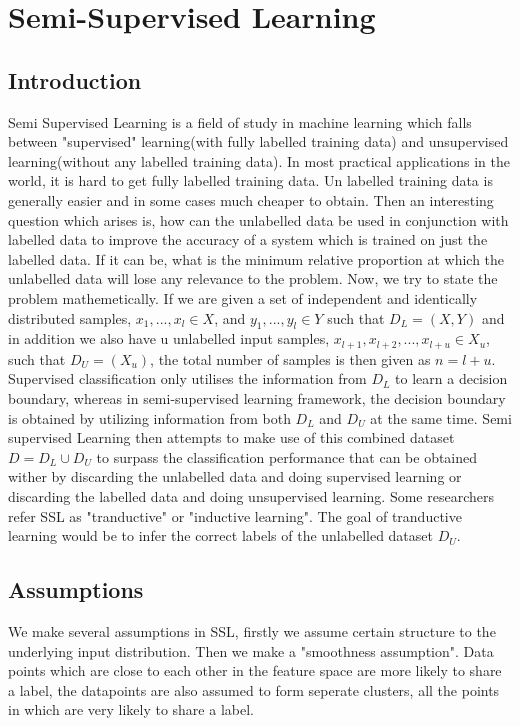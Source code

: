 \documentclass[a4paper,11pt]{kth-mag}
\begin{document}
\chapter{Semi-Supervised Learning}
\section{Introduction}
Semi Supervised Learning is a field of study in machine learning which falls between "supervised" learning(with fully labelled training data) and unsupervised learning(without any labelled training data). In most practical applications in the world, it is hard to get fully labelled training data. Un labelled training data is generally easier and in some cases much cheaper to obtain. Then an interesting question which arises is, how can the unlabelled data be used in conjunction with labelled data to improve the accuracy of a system which is trained on just the labelled data. If it can be, what is the minimum relative proportion at which the unlabelled data will lose any relevance to the problem. Now, we try to state the problem mathemetically. If we are given a set of  independent and identically distributed samples, $x_{1}, ..., x_{l} \in X$, and $y_{1}, ..., y_{l} \in Y$ such that $D_{L} = (X,Y)$ and in addition we also have u unlabelled input samples, $x_{l+1}, x_{l+2}, ..., x_{l+u} \in X_{u}$, such that $D_{U} = (X_{u})$, the total number of samples is then given as $n=l + u$. Supervised classification only utilises the information from $D_{L}$ to learn a decision boundary, whereas in semi-supervised learning framework, the decision boundary is obtained by utilizing information from both $D_{L}$ and $D_{U}$ at the same time. Semi supervised Learning then attempts to make use of this combined dataset $D = D_{L} \cup D_{U}$ to surpass the classification performance that can be obtained wither by discarding the unlabelled data and doing supervised learning or discarding the labelled data and doing unsupervised learning. Some researchers refer SSL as "tranductive" or "inductive learning". The goal of tranductive learning would be to infer the correct labels of the unlabelled dataset $D_{U}$. 
\section{Assumptions}
We make several assumptions in SSL, firstly we assume certain structure to the underlying input distribution. Then we make a "smoothness assumption". Data points which are close to each other in the feature space are more likely to share a label, the datapoints are also assumed to form seperate clusters, all the points in which are very likely to share a label. 
\end{document}
